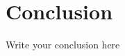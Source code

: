 \documentclass[12pt]{article}
\begin{document}



\section{Conclusion}

Write your conclusion here



\end{document}

